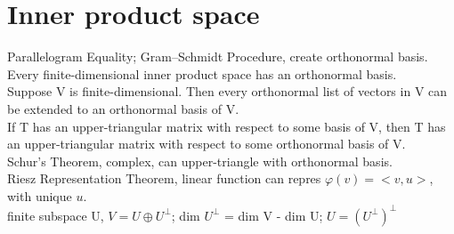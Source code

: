 \documentclass[paper=a4, fontsize=11pt]{scrartcl} %
\numberwithin{equation}{section} %
\numberwithin{figure}{section} %
\numberwithin{table}{section} %
\begin{document}
\section{Inner product space}
Parallelogram Equality; Gram–Schmidt Procedure, create orthonormal basis.\\
Every finite-dimensional inner product space has an orthonormal basis.\\
Suppose V is finite-dimensional. Then every orthonormal list of vectors in V can be extended to an orthonormal basis of V.\\
If T has an upper-triangular matrix with respect to some basis of V, then T has an upper-triangular matrix with respect to some orthonormal basis of V.\\
Schur’s Theorem, complex, can upper-triangle with orthonormal basis.\\
Riesz Representation Theorem, linear function can repres $\varphi(v)=<v,u>$, with unique $u$.\\
finite subspace U, $V=U\oplus U^\bot$; dim $U^\bot$ = dim V - dim U; $U=(U^\bot)^\bot$\\
\end{document}
